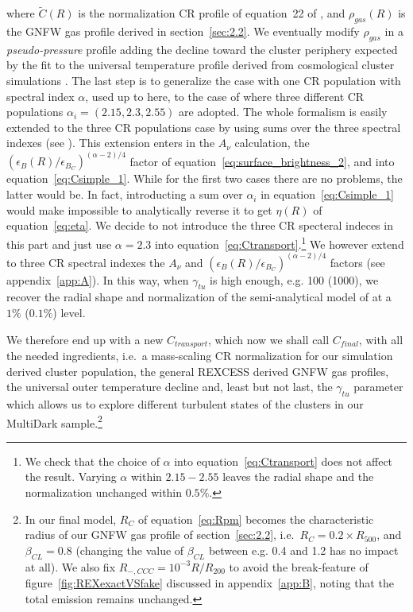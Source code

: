 \documentclass[traditabstract]{aa}
\begin{document}
where $\tilde{C}(R)$ is the normalization CR profile of equation~22 of \cite{2010MNRAS.409..449P}, and $\rho_{gas}(R)$ is the GNFW gas profile derived in section~\ref{sec:2.2}. We eventually modify $\rho_{gas}$ in a \emph{pseudo-pressure} profile adding the decline toward the cluster periphery expected by the fit to the universal temperature profile derived from cosmological cluster simulations \citep{2007MNRAS.378..385P,2010MNRAS.409..449P}. The last step is to generalize the case with one CR population with spectral index $\alpha$, used up to here, to the case of \cite{2010MNRAS.409..449P} where three different CR populations $\alpha_{i}=(2.15,2.3,2.55)$ are adopted. The whole formalism is easily extended to the three CR populations case by using sums over the three spectral indexes (see \citealp{2010MNRAS.409..449P}). This extension enters in the $A_{\nu}$ calculation, the $(\epsilon_{B}(R)/\epsilon_{B_{C}})^{(\alpha-2)/4}$ factor of equation~\ref{eq:surface_brightness_2}, and into equation~\ref{eq:Csimple_1}. While for the first two cases there are no problems, the latter would be. In fact, introducting a sum over $\alpha_{i}$ in equation~\ref{eq:Csimple_1} would make impossible to analytically reverse it to get $\eta(R)$ of equation~\ref{eq:eta}. We decide to not introduce the three CR specteral indeces in this part and just use $\alpha = 2.3$ into equation~\ref{eq:Ctransport}.\footnote[9]{We check that the choice of $\alpha$ into equation~\ref{eq:Ctransport} does not affect the result. Varying $\alpha$ within $2.15-2.55$ leaves the radial shape and the normalization unchanged within $0.5\%$.} We however extend to three CR spectral indexes the $A_{\nu}$ and $(\epsilon_{B}(R)/\epsilon_{B_{C}})^{(\alpha-2)/4}$ factors (see appendix~\ref{app:A}). In this way, when $\gamma_{tu}$ is high enough, e.g. 100 (1000), we recover the radial shape and normalization of the semi-analytical model of \cite{2010MNRAS.409..449P} at a $1\%$ ($0.1\%$) level.

We therefore end up with a new $C_{transport}$, which now we shall call $C_{final}$, with all the needed ingredients, i.e.~a mass-scaling CR normalization for our simulation derived cluster population, the general REXCESS derived GNFW gas profiles, the universal outer temperature decline and, least but not last, the $\gamma_{tu}$ parameter which allows us to explore different turbulent states of the clusters in our MultiDark sample.\footnote[10]{In our final model, $R_{C}$ of equation~\ref{eq:Rpm} becomes the characteristic radius of our GNFW gas profile of section~\ref{sec:2.2}, i.e.~$R_{C}=0.2\times R_{500}$, and $\beta_{CL}=0.8$ (changing the value of $\beta_{CL}$ between e.g. 0.4 and 1.2 has no impact at all). We also fix $R_{-, CCC} = 10^{-3} R/R_{200}$ to avoid the break-feature of figure~\ref{fig:REXexactVSfake} discussed in appendix~\ref{app:B}, noting that the total emission remains unchanged.}
\end{document}
